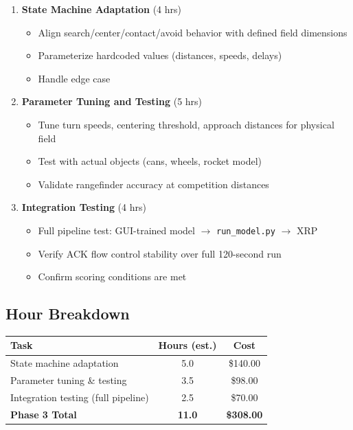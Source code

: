 \documentclass[a4paper]{article}
\begin{document}
\begin{enumerate}[leftmargin=*]
    \item \textbf{State Machine Adaptation} (4 hrs)
    \begin{itemize}
        \item Align search/center/contact/avoid behavior with defined field dimensions
        \item Parameterize hardcoded values (distances, speeds, delays)
        \item Handle edge case
    \end{itemize}

    \item \textbf{Parameter Tuning and Testing} (5 hrs)
    \begin{itemize}
        \item Tune turn speeds, centering threshold, approach distances for physical field
        \item Test with actual objects (cans, wheels, rocket model)
        \item Validate rangefinder accuracy at competition distances
    \end{itemize}

    \item \textbf{Integration Testing} (4 hrs)
    \begin{itemize}
        \item Full pipeline test: GUI-trained model $\rightarrow$ \texttt{run\_model.py} $\rightarrow$ XRP
        \item Verify ACK flow control stability over full 120-second run
        \item Confirm scoring conditions are met 
    \end{itemize}
\end{enumerate}

\subsection*{Hour Breakdown}

\begin{center}
\begin{tabular}{lcc}
\toprule
\textbf{Task} & \textbf{Hours (est.)} & \textbf{Cost} \\
\midrule
State machine adaptation & 5.0 & \$140.00 \\
Parameter tuning \& testing & 3.5 & \$98.00 \\
Integration testing (full pipeline) & 2.5 & \$70.00 \\
\midrule
\textbf{Phase 3 Total} & \textbf{11.0} & \textbf{\$308.00} \\
\bottomrule
\end{tabular}
\end{center}
\end{document}
